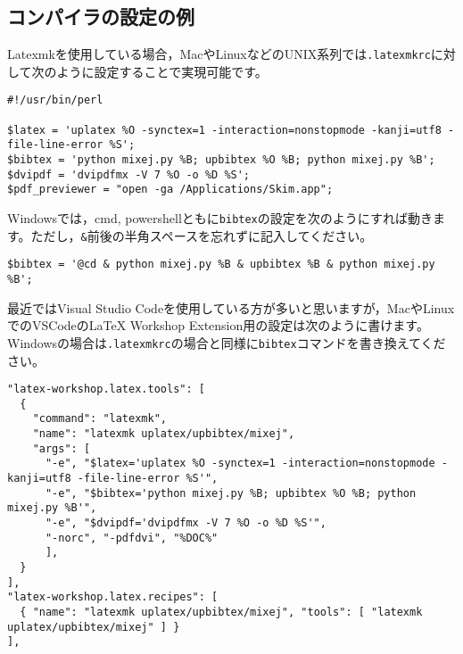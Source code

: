 \documentclass[11pt, a4paper, dvipdfmx, uplatex]{jsarticle}
\begin{document}
\subsection{コンパイラの設定の例}

Latexmkを使用している場合，MacやLinuxなどのUNIX系列では\texttt{.latexmkrc}に対して次のように設定することで実現可能です。

\noindent\makebox[\linewidth]{\rule{\linewidth}{0.4pt}}\vspace{-0.5zw}
\begin{lstlisting}[style=onecol]
#!/usr/bin/perl

$latex = 'uplatex %O -synctex=1 -interaction=nonstopmode -kanji=utf8 -file-line-error %S';
$bibtex = 'python mixej.py %B; upbibtex %O %B; python mixej.py %B';
$dvipdf = 'dvipdfmx -V 7 %O -o %D %S';
$pdf_previewer = "open -ga /Applications/Skim.app";
\end{lstlisting}\vspace{-1.8zw}
\noindent\makebox[\linewidth]{\rule{\linewidth}{0.4pt}}\vspace{0.5zw}\par

\noindent
Windowsでは，cmd, powershellともに\texttt{bibtex}の設定を次のようにすれば動きます。ただし，\texttt{\&}前後の半角スペースを忘れずに記入してください。

\noindent\makebox[\linewidth]{\rule{\linewidth}{0.4pt}}\vspace{-0.5zw}
\begin{lstlisting}[style=onecol]
$bibtex = '@cd & python mixej.py %B & upbibtex %B & python mixej.py %B';
\end{lstlisting}\vspace{-1.8zw}
\noindent\makebox[\linewidth]{\rule{\linewidth}{0.4pt}}\vspace{0.5zw}\par


最近ではVisual Studio Codeを使用している方が多いと思いますが，MacやLinuxでのVSCodeのLaTeX Workshop Extension用の設定は次のように書けます。Windowsの場合は\texttt{.latexmkrc}の場合と同様に\texttt{bibtex}コマンドを書き換えてください。

\noindent\makebox[\linewidth]{\rule{\linewidth}{0.4pt}}\vspace{-0.5zw}
\begin{lstlisting}[style=onecol]
"latex-workshop.latex.tools": [
  {
    "command": "latexmk",
    "name": "latexmk uplatex/upbibtex/mixej",
    "args": [
      "-e", "$latex='uplatex %O -synctex=1 -interaction=nonstopmode -kanji=utf8 -file-line-error %S'",
      "-e", "$bibtex='python mixej.py %B; upbibtex %O %B; python mixej.py %B'",
      "-e", "$dvipdf='dvipdfmx -V 7 %O -o %D %S'",
      "-norc", "-pdfdvi", "%DOC%"
      ],
  }
],
"latex-workshop.latex.recipes": [
  { "name": "latexmk uplatex/upbibtex/mixej", "tools": [ "latexmk uplatex/upbibtex/mixej" ] }
],
\end{lstlisting}\vspace{-1.8zw}
\noindent\makebox[\linewidth]{\rule{\linewidth}{0.4pt}}\vspace{0.5zw}\par
\end{document}
